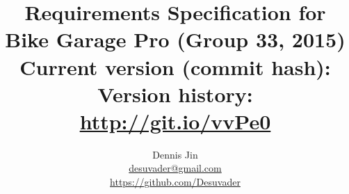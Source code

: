 \title{
	Requirements Specification for Bike Garage Pro (Group 33, 2015)\\
	\vspace{0.2in}
	\normalsize Current version (commit hash): \gitAbbrevHash\\
	\normalsize Version history: \url{http://git.io/vvPe0}
}
\author{
	Dennis Jin\\
	\url{desuvader@gmail.com}\\
	\url{https://github.com/Desuvader}\\
}
\date{}